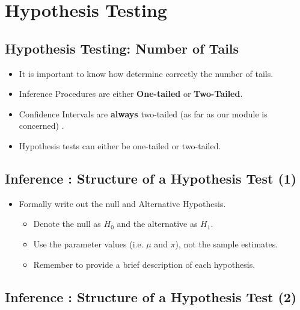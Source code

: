 \documentclass[]{report}
\begin{document}
{\section{Hypothesis Testing}






\subsection{Hypothesis Testing: Number of Tails}
\begin{itemize}
\item It is important to know how determine correctly the number of tails.
\item Inference Procedures are either \textbf{One-tailed} or \textbf{Two-Tailed}.
\item Confidence Intervals are \textbf{always} two-tailed (as far as our module is concerned) . 
\item Hypothesis tests can either be one-tailed or two-tailed. 
\end{itemize}




{




\subsection{Inference : Structure of a Hypothesis Test (1) }

\begin{itemize}
\item Formally write out the null and Alternative Hypothesis.
\begin{itemize}
\item Denote the null as $H_0$ and the alternative as $H_1$.
\item Use the parameter values (i.e. $\mu$ and $\pi$), not the sample estimates.
\item Remember to provide a brief description of each hypothesis.
\end{itemize}
\end{itemize}

\subsection{Inference : Structure of a Hypothesis Test (2) }


}}
\end{document}
